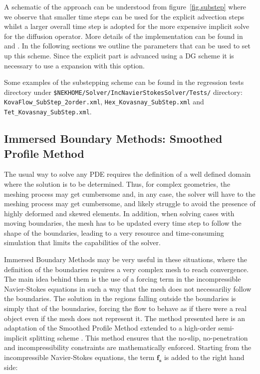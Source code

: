 A schematic of the approach can be understood from figure~\ref{fig.substep}
where we observe that smaller time steps can be used
for the explicit advection steps whilst a larger overall time step is
adopted for the more expensive implicit solve for the diffusion
operator. More details of the implementation can be found in
\cite{XiShDoKa} and \cite{Sh03}. In the following sections we outline
the parameters that can be used to set up this scheme. Since the
explicit part is advanced using a DG scheme it is necessary to use a
 expansion with this option.

\begin{notebox}
Some examples of the substepping scheme can be found in the regression tests
directory under
\texttt{\${NEKHOME}/Solver/IncNavierStokesSolver/Tests/} directory:
\texttt{KovaFlow\_SubStep\_2order.xml},
\texttt{Hex\_Kovasnay\_SubStep.xml} and
\texttt{Tet\_Kovasnay\_SubStep.xml}.
\end{notebox}
\subsection{Immersed Boundary Methods: Smoothed Profile Method}
\label{SPM}

The usual way to solve any PDE requires the definition of a well defined domain
where the solution is to be determined. Thus, for complex geometries, the
meshing process may get cumbersome and, in any case, the solver will have to
the meshing process may get cumbersome, and likely struggle to avoid the
presence of highly deformed and skewed elements. In addition, when solving
cases with moving boundaries, the mesh has to be updated every time step to
follow the shape of the boundaries, leading to a very resource and
time-consuming simulation that limits the capabilities of the solver.

Immersed Boundary Methods may be very useful in these situations, where the
definition of the boundaries requires a very complex mesh to reach
convergence. The main idea behind them is the use of a forcing term in the
incompressible Navier-Stokes equations in such a way that the mesh does not
necessariliy follow the boundaries. The solution in the regions falling outside
the boundaries is simply that of the boundaries, forcing the flow to behave as
if there were a real object even if the mesh does not represent it. The method
presented here is an adaptation of the Smoothed Profile Method
\cite{NakayamaSPM} extended to a high-order semi-implicit splitting scheme
\cite{LuoSPM, WangSPM}. This method ensures that the no-slip, no-penetration
and incompressibility constraints are mathematically enforced. Starting from
the incompressible Navier-Stokes equations, the term $\mathbf{f_s}$ is added to
the right hand side:

